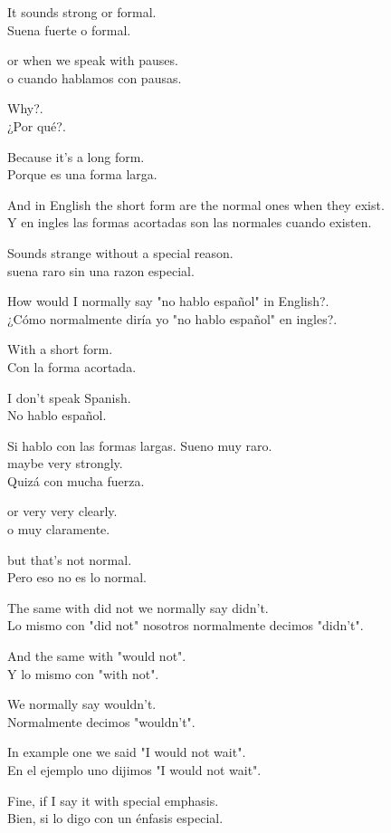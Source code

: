 It sounds strong or formal.\\
Suena fuerte o formal.

or when we speak with pauses.\\
o cuando hablamos con pausas.

Why?.\\
¿Por qué?.

Because it's a long form.\\
Porque es una forma larga.

And in English the short form are the normal ones
when they exist.\\
Y en ingles las formas acortadas son las normales
cuando existen.

Sounds strange without a special reason.\\
suena raro sin una razon especial.

How would I normally say "no hablo español" in English?.\\
¿Cómo normalmente diría yo "no hablo español" en ingles?.

With a short form.\\
Con la forma acortada.

I don't speak Spanish.\\
No hablo español.

Si hablo con las formas largas. Sueno muy raro.\\
maybe very strongly.\\
Quizá con mucha fuerza.

or very very clearly.\\
o muy claramente.

but that's not normal.\\
Pero eso no es lo normal.

The same with did not we normally say didn't.\\
Lo mismo con "did not" nosotros normalmente decimos "didn't".

And the same with "would not".\\
Y lo mismo con "with not".

We normally say wouldn't.\\
Normalmente decimos "wouldn't".

In example one we said "I would not wait".\\
En el ejemplo uno dijimos "I would not wait".

Fine, if I say it with special emphasis.\\
Bien, si lo digo con un énfasis especial.

